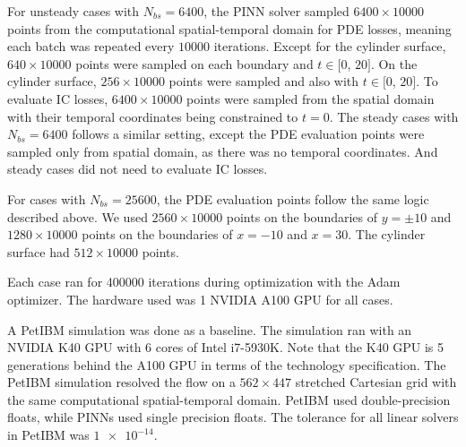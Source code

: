 For unsteady cases with $N_{bs}=\num{6400}$, the PINN solver sampled $\num{6400}\times \num{10000}$ points from the computational spatial-temporal domain for PDE losses, meaning each batch was repeated every $\num{10000}$ iterations.
Except for the cylinder surface, $640\times \num{10000}$ points were sampled on each boundary and $t\in[0$, $20]$.
On the cylinder surface, $256\times \num{10000}$ points were sampled and also with $t\in[0$, $20]$.
To evaluate IC losses, $\num{6400}\times \num{10000}$ points were sampled from the spatial domain with their temporal coordinates being constrained to $t=0$.
The steady cases with $N_{bs}=\num{6400}$ follows a similar setting, except the PDE evaluation points were sampled only from spatial domain, as there was no temporal coordinates.
And steady cases did not need to evaluate IC losses.

For cases with $N_{bs}=\num{25600}$, the PDE evaluation points follow the same logic described above.
We used $\num{2560}\times \num{10000}$ points on the boundaries of $y=\pm 10$ and $\num{1280}\times \num{10000}$ points on the boundaries of $x=-10$ and $x=30$.
The cylinder surface had $512\times \num{10000}$ points.

Each case ran for \num{400000} iterations during optimization with the Adam optimizer.
The hardware used was 1 NVIDIA A100 GPU for all cases.

A PetIBM simulation was done as a baseline.
The simulation ran with an NVIDIA K40 GPU with 6 cores of Intel i7-5930K.
Note that the K40 GPU is 5 generations behind the A100 GPU in terms of the technology specification.
The PetIBM simulation resolved the flow on a $562 \times 447$ stretched Cartesian grid with the same computational spatial-temporal domain.
PetIBM used double-precision floats, while PINNs used single precision floats.
The tolerance for all linear solvers in PetIBM was $\num{1e-14}$.
